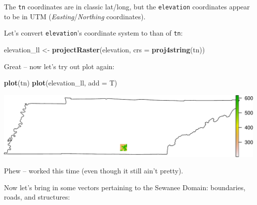 \documentclass[]{book}
\newenvironment{Shaded}{\begin{snugshade}}{\end{snugshade}}
\newcommand{\DataTypeTok}[1]{\textcolor[rgb]{0.13,0.29,0.53}{#1}}
\newcommand{\KeywordTok}[1]{\textcolor[rgb]{0.13,0.29,0.53}{\textbf{#1}}}
\newcommand{\NormalTok}[1]{#1}
\newcommand{\StringTok}[1]{\textcolor[rgb]{0.31,0.60,0.02}{#1}}
\begin{document}
The \texttt{tn} coordinates are in classic lat/long, but the \texttt{elevation} coordinates appear to be in UTM (\emph{Easting}/\emph{Northing} coordinates).

Let's convert \texttt{elevation}'s coordinate system to than of \texttt{tn}:

\begin{Shaded}
\begin{Highlighting}[]
\NormalTok{elevation_ll <-}\StringTok{ }\KeywordTok{projectRaster}\NormalTok{(elevation, }
                              \DataTypeTok{crs =} \KeywordTok{proj4string}\NormalTok{(tn))}
\end{Highlighting}
\end{Shaded}

Great -- now let's try out plot again:

\begin{Shaded}
\begin{Highlighting}[]
\KeywordTok{plot}\NormalTok{(tn)}
\KeywordTok{plot}\NormalTok{(elevation_ll, }\DataTypeTok{add =}\NormalTok{ T)}
\end{Highlighting}
\end{Shaded}

\includegraphics{figures/unnamed-chunk-652-1.pdf}

Phew -- worked this time (even though it still ain't pretty).

Now let's bring in some vectors pertaining to the Sewanee Domain: boundaries, roads, and structures:
\end{document}
